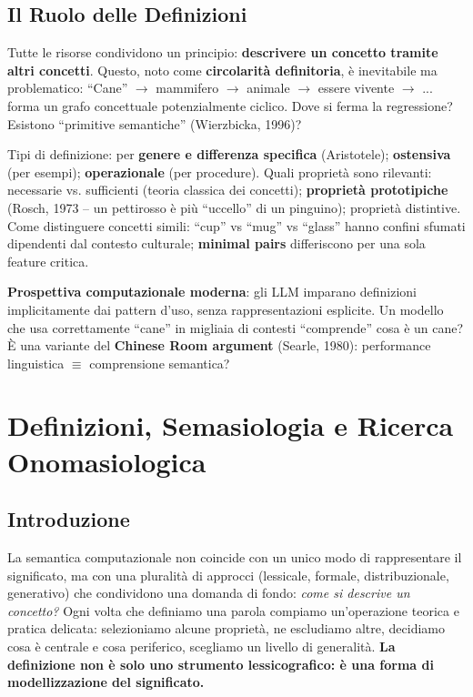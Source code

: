 \documentclass[12pt,a4paper]{article}
\begin{document}
\subsection{Il Ruolo delle Definizioni}

Tutte le risorse condividono un principio: \textbf{descrivere un concetto tramite altri concetti}. Questo, noto come \textbf{circolarit\`a definitoria}, \`e inevitabile ma problematico: ``Cane'' $\to$ mammifero $\to$ animale $\to$ essere vivente $\to$ ... forma un grafo concettuale potenzialmente ciclico. Dove si ferma la regressione? Esistono ``primitive semantiche'' (Wierzbicka, 1996)?

Tipi di definizione: per \textbf{genere e differenza specifica} (Aristotele); \textbf{ostensiva} (per esempi); \textbf{operazionale} (per procedure). Quali propriet\`a sono rilevanti: necessarie vs. sufficienti (teoria classica dei concetti); \textbf{propriet\`a prototipiche} (Rosch, 1973 -- un pettirosso \`e pi\`u ``uccello'' di un pinguino); propriet\`a distintive. Come distinguere concetti simili: ``cup'' vs ``mug'' vs ``glass'' hanno confini sfumati dipendenti dal contesto culturale; \textbf{minimal pairs} differiscono per una sola feature critica.

\begin{quizbox}
\textbf{Prospettiva computazionale moderna}: gli LLM imparano definizioni implicitamente dai pattern d'uso, senza rappresentazioni esplicite. Un modello che usa correttamente ``cane'' in migliaia di contesti ``comprende'' cosa \`e un cane? \`E una variante del \textbf{Chinese Room argument} (Searle, 1980): performance linguistica $\equiv$ comprensione semantica?
\end{quizbox}

\section{Definizioni, Semasiologia e Ricerca Onomasiologica}

\subsection{Introduzione}

La semantica computazionale non coincide con un unico modo di rappresentare il significato, ma con una pluralit\`a di approcci (lessicale, formale, distribuzionale, generativo) che condividono una domanda di fondo: \emph{come si descrive un concetto?} Ogni volta che definiamo una parola compiamo un'operazione teorica e pratica delicata: selezioniamo alcune propriet\`a, ne escludiamo altre, decidiamo cosa \`e centrale e cosa periferico, scegliamo un livello di generalit\`a. \textbf{La definizione non \`e solo uno strumento lessicografico: \`e una forma di modellizzazione del significato.}
\end{document}
